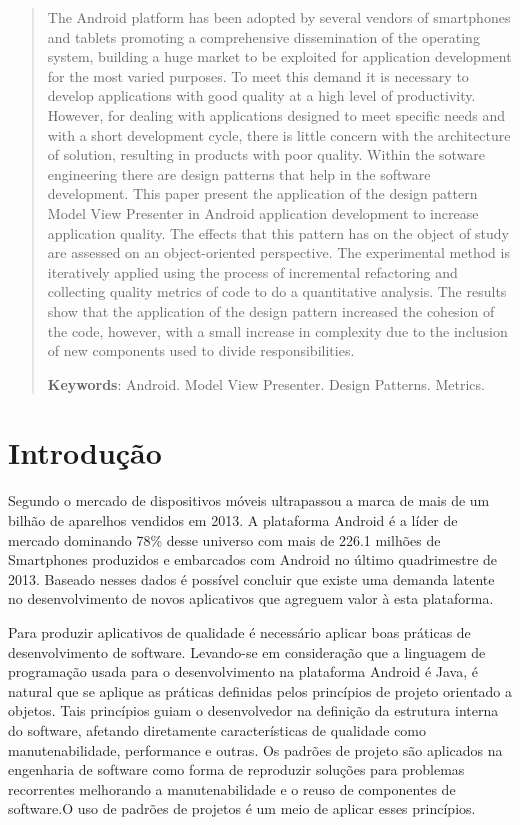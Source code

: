 \documentclass[conference]{IEEEtran}
\begin{document}
\begin{abstract}

The Android platform has been adopted by several vendors of smartphones and
tablets promoting a comprehensive dissemination of the operating system,
building a huge market to be exploited for application development
for the most varied purposes. To meet this demand it is necessary to
develop applications with good quality at a high level of productivity.
However, for dealing with applications designed to meet specific needs and with a
short development cycle, there is little concern with the architecture of
solution, resulting in products with poor quality. Within the sotware
engineering there are design patterns that help in the software development.
This paper present the application of the design pattern Model View
Presenter in Android application development to increase application quality.
The effects that this pattern has on the object of study are assessed on an
object-oriented perspective. The experimental method is iteratively applied
using the process of incremental refactoring and collecting quality metrics of
code to do a quantitative analysis. The results show that the application of the
design pattern increased the cohesion of the code, however, with a small
increase in complexity due to the inclusion of new components used to divide
responsibilities.


\noindent
\textbf{Keywords}: Android. Model View Presenter. Design Patterns. Metrics.

\end{abstract}

\section{Introdução}

Segundo \cite{idc} o mercado de dispositivos móveis ultrapassou a marca de mais de um
bilhão de aparelhos vendidos em 2013. A plataforma Android é a líder
de mercado dominando 78\% desse universo com mais de 226.1 milhões de
Smartphones produzidos e embarcados com Android no último quadrimestre de 2013.
Baseado nesses dados é possível concluir que existe uma demanda latente no
desenvolvimento de novos aplicativos que agreguem valor à esta plataforma.

Para produzir aplicativos de qualidade é necessário aplicar boas práticas de
desenvolvimento de software. Levando-se em consideração que a linguagem de
programação usada para o desenvolvimento na plataforma Android é Java, é
natural que se aplique as práticas definidas pelos princípios de projeto
orientado a objetos. Tais  princípios guiam o desenvolvedor na definição da
estrutura interna do software, afetando diretamente características  de
qualidade como manutenabilidade, performance e outras\cite{tempero-di}. Os
padrões de projeto são aplicados na engenharia de software como forma de
reproduzir  soluções  para problemas recorrentes melhorando a manutenabilidade
e o reuso de componentes de software\cite{gof}.O uso de padrões de projetos é
um meio de aplicar esses princípios.
\end{document}
